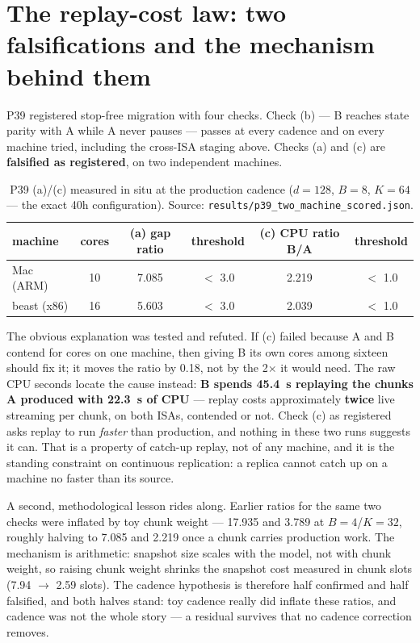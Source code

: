 \documentclass[11pt]{article}
\theoremstyle{definition}
\newcommand{\code}[1]{\texttt{#1}}
\begin{document}
\section{The replay-cost law: two falsifications and the mechanism behind them}
\label{sec:replay}

P39 registered stop-free migration with four checks. Check (b) --- B reaches
state parity with A while A never pauses --- passes at every cadence and on
every machine tried, including the cross-ISA staging above. Checks (a) and
(c) are \textbf{falsified as registered}, on two independent machines.

\begin{table}[tb]
\centering
\caption{P39 (a)/(c) measured in situ at the production cadence
($d{=}128$, $B{=}8$, $K{=}64$ --- the exact 40h configuration).
Source: \code{results/p39\_two\_machine\_scored.json}.}
\label{tab:p39}
\begin{tabular}{@{}lccccc@{}}
\toprule
machine & cores & (a) gap ratio & threshold & (c) CPU ratio B/A & threshold\\
\midrule
Mac (ARM) & 10 & 7.085 & $<$ 3.0 & 2.219 & $<$ 1.0\\
beast (x86) & 16 & 5.603 & $<$ 3.0 & 2.039 & $<$ 1.0\\
\bottomrule
\end{tabular}
\end{table}

The obvious explanation was tested and refuted. If (c) failed because A and
B contend for cores on one machine, then giving B its own cores among
sixteen should fix it; it moves the ratio by 0.18, not by the 2$\times$ it
would need. The raw CPU seconds locate the cause instead: \textbf{B spends
45.4~s replaying the chunks A produced with 22.3~s of CPU} --- replay costs
approximately \textbf{twice} live streaming per chunk, on both ISAs,
contended or not. Check (c) as registered asks replay to run \emph{faster}
than production, and nothing in these two runs suggests it can. That is a
property of catch-up replay, not of any machine, and it is the standing
constraint on continuous replication: a replica cannot catch up on a machine
no faster than its source.

A second, methodological lesson rides along. Earlier ratios for the same two
checks were inflated by toy chunk weight --- 17.935 and 3.789 at
$B{=}4$/$K{=}32$, roughly halving to 7.085 and 2.219 once a chunk carries
production work. The mechanism is arithmetic: snapshot size scales with the
model, not with chunk weight, so raising chunk weight shrinks the snapshot
cost measured in chunk slots (7.94 $\to$ 2.59 slots). The cadence hypothesis
is therefore half confirmed and half falsified, and both halves stand: toy
cadence really did inflate these ratios, and cadence was not the whole story
--- a residual survives that no cadence correction removes.
\end{document}

